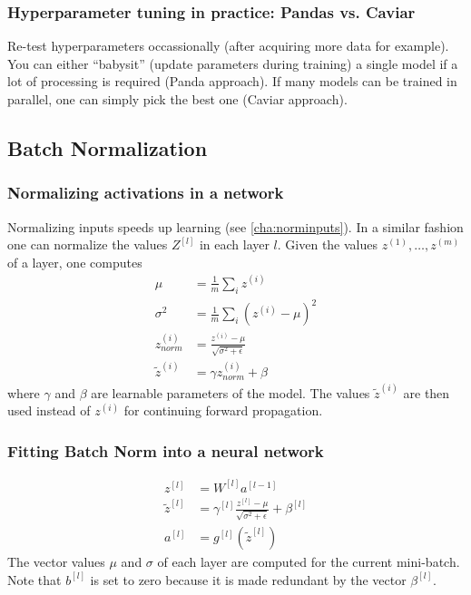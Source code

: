 \documentclass{article}
\begin{document}
\subsubsection{Hyperparameter tuning in practice: Pandas vs. Caviar}
Re-test hyperparameters occassionally (after acquiring more data for example).
You can either ``babysit'' (update parameters during training) a single model if a lot of processing is required (Panda approach).
If many models can be trained in parallel, one can simply pick the best one (Caviar approach).

\subsection{Batch Normalization}
\subsubsection{Normalizing activations in a network}
Normalizing inputs speeds up learning (see \cref{cha:norminputs}).
In a similar fashion one can normalize the values $Z^{[l]}$ in each layer $l$.
Given the values $z^{(1)},\ldots,z^{(m)}$ of a layer, one computes
\begin{equation}
  \begin{split}
    \mu&=\frac{1}{m}\sum_i z^{(i)}\\
    \sigma^2&=\frac{1}{m}\sum_i (z^{(i)}-\mu)^2\\
    z^{(i)}_{norm}&=\frac{z^{(i)}-\mu}{\sqrt{\sigma^2+\epsilon}}\\
    \tilde{z}^{(i)}&=\gamma z^{(i)}_{norm}+\beta
  \end{split}
\end{equation}
where $\gamma$ and $\beta$ are learnable parameters of the model.
The values $\tilde{z}^{(i)}$ are then used instead of $z^{(i)}$ for continuing forward propagation.

\subsubsection{Fitting Batch Norm into a neural network}
\begin{equation}
  \begin{split}
    z^{[l]}&=W^{[l]}a^{[l-1]}\\
    \tilde{z}^{[l]}&=\gamma^{[l]}\frac{z^{[l]}-\mu}{\sqrt{\sigma^2+\epsilon}}+\beta^{[l]}\\
    a^{[l]}&=g^{[l]}(\tilde{z}^{[l]})
  \end{split}
\end{equation}
The vector values $\mu$ and $\sigma$ of each layer are computed for the current mini-batch.
Note that $b^{[l]}$ is set to zero because it is made redundant by the vector $\beta^{[l]}$.
\end{document}
